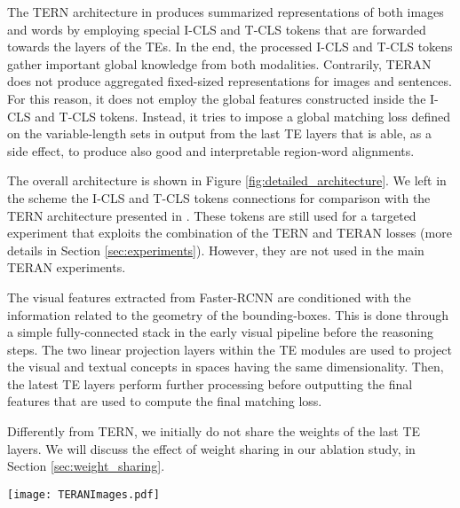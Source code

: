 \documentclass[acmsmall]{acmart}
\newif\ifdraft
\newcommand{\revised}[1]{\ifdraft{\leavevmode\color{blue}{#1}}\else{#1}\fi}
\begin{document}
The TERN architecture in \cite{messina2020tern} produces summarized representations of both images and words by employing special I-CLS and T-CLS tokens that are forwarded towards the layers of the TEs. In the end, the processed I-CLS and T-CLS tokens gather important global knowledge from both modalities.
Contrarily, TERAN does not produce aggregated fixed-sized representations for images and sentences. \revised{For this reason, it does not employ the global features constructed inside the I-CLS and T-CLS tokens}. Instead, it tries to impose a global matching loss defined on the variable-length sets in output from the last TE layers that is able, as a side effect, to produce also good and interpretable region-word alignments.









The overall architecture is shown in Figure \ref{fig:detailed_architecture}. \revised{We left in the scheme the I-CLS and T-CLS tokens connections for comparison with the TERN architecture presented in \cite{messina2020tern}. These tokens are still used for a targeted experiment that exploits the combination of the TERN and TERAN losses (more details in Section \ref{sec:experiments}). However, they are not used in the main TERAN experiments.}

\revised{The visual features extracted from Faster-RCNN are conditioned with the information related to the geometry of the bounding-boxes. This is done through a simple fully-connected stack in the early visual pipeline before the reasoning steps.}
The two linear projection layers within the TE modules are used to project the visual and textual concepts in spaces having the same dimensionality. Then, the latest TE layers perform further processing before outputting the final features that are used to compute the final matching loss.

Differently from TERN, we initially do not share the weights of the last TE layers. We will discuss the effect of weight sharing in our ablation study, in Section \ref{sec:weight_sharing}.

\begin{figure*}[t]
    \centering
    \texttt{[image: TERANImages.pdf]}
  \caption{The proposed TERAN architecture. \revised{TEs stands for Transformer Encoders, and it indicates a stack of TE layers whose internals are recalled in Section \ref{sec:te} and explained in detail in \cite{vaswani2017transformer}. Region and word features are extracted through a bottom-up attention model based on Faster-RCNN and BERT, respectively. The final image-text (I-T) similarity score is obtained by pooling a region-word (R-W) similarity matrix. Note that the special I-CLS and T-CLS are not used in the basic formulation of TERAN.}}
  \label{fig:detailed_architecture} 
\end{figure*}
\end{document}
